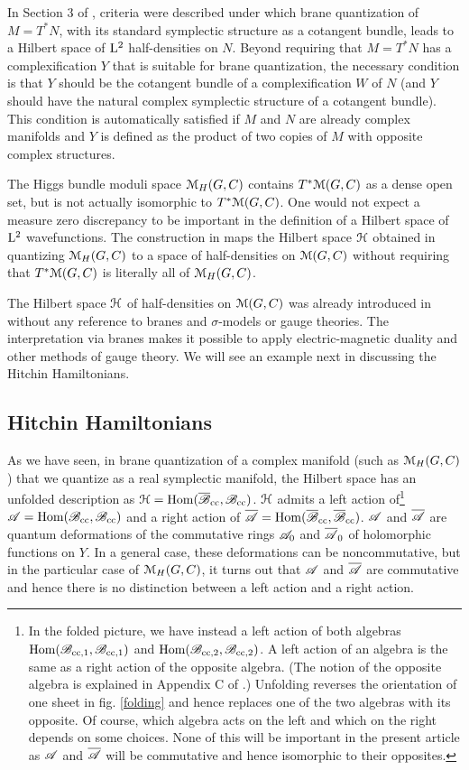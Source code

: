 \documentclass[11pt,a4paper]{article}
\begin{document}
In Section 3 of \cite{GW}, criteria were described under which brane quantization of $M=T^*N$, with its standard symplectic structure as a cotangent
bundle,  leads to a Hilbert space of ${\mathrm L}^2$ half-densities on $N$.
Beyond requiring that $M=T^*N$ has a complexification $Y$ that is suitable for brane quantization, the necessary condition 
is that $Y$ should be the cotangent bundle of a complexification $W$ of $N$ (and $Y$ should have the natural complex symplectic structure
of a cotangent bundle).    This condition is automatically satisfied if $M$ and $N$ are already complex manifolds and $Y$ is defined
as the product of two copies of $M$ with opposite complex structures.

The Higgs bundle moduli space ${\mathcal M}_H(G,C)$ contains $T^*{\mathcal M}(G,C)$ as a dense open set, but is not actually isomorphic to $T^*{\mathcal M}(G,C)$.   One would not
expect a measure zero discrepancy to be important in the definition of a Hilbert space of ${\mathrm L}^2$ wavefunctions.   The construction in \cite{GW} maps
the Hilbert space ${\mathcal H}$ obtained in quantizing ${\mathcal M}_H(G,C)$  to a space of half-densities on ${\mathcal M}(G,C)$ without requiring that $T^*{\mathcal M}(G,C)$ is literally all of ${\mathcal M}_H(G,C)$.

The Hilbert space ${\mathcal H}$ of half-densities on ${\mathcal M}(G,C)$ 
was already introduced in \cite{EFK} without any reference to branes and $\sigma$-models or gauge theories.   The  interpretation via branes
makes it possible to apply  electric-magnetic duality and other methods of  gauge theory.  We will see an example next in discussing the Hitchin 
Hamiltonians.


\subsection{Hitchin Hamiltonians}\label{hh}

As we have seen, in brane quantization of a complex manifold (such as ${\mathcal M}_H(G,C)$) that we quantize as a real symplectic manifold, the Hilbert space has an unfolded description as
${\mathcal H}={\mathrm{Hom}}(\overline{{\mathscr B}}_{\mathrm{cc}},{\mathscr B}_{\mathrm{cc}})$.   ${\mathcal H}$ admits a left action of\footnote{In the folded picture, we have instead a left action of both algebras
${\mathrm{Hom}}({\mathscr B}_{{\mathrm{cc}},1},{\mathscr B}_{{\mathrm{cc}},1})$ and ${\mathrm{Hom}}({\mathscr B}_{{\mathrm{cc}},2},{\mathscr B}_{{\mathrm{cc}},2})$. A left action of an algebra is the same as a right action of the opposite algebra. (The notion
of the opposite algebra
is explained in Appendix C of \cite{GW}.)   Unfolding reverses
the orientation of one sheet in fig. \ref{folding} and hence replaces one of the two algebras with its opposite.   Of course, which algebra
acts on the left and which on the right depends on some choices.   None of this will be important in the present article as ${\mathscr A}$ and $\overline{{\mathscr A}}$ will be commutative and
hence isomorphic to their opposites.}
${\mathscr A}={\mathrm{Hom}}({\mathscr B}_{\mathrm{cc}},{\mathscr B}_{\mathrm{cc}})$ and a right action of $\overline{{\mathscr A}}={\mathrm{Hom}}(\overline{{\mathscr B}}_{\mathrm{cc}},\overline{{\mathscr B}}_{\mathrm{cc}})$.
${\mathscr A}$ and $\overline{{\mathscr A}}$ are quantum deformations of the commutative rings ${\mathscr A}_0$ and $\overline{{\mathscr A}}_0$ of holomorphic functions on $Y$.  In a general case,  these
deformations can be noncommutative, but 
in the particular case of ${\mathcal M}_H(G,C)$, it turns out that ${\mathscr A}$ and $\overline{{\mathscr A}}$ are commutative and hence there is no distinction between a left action and a right action.
\end{document}
